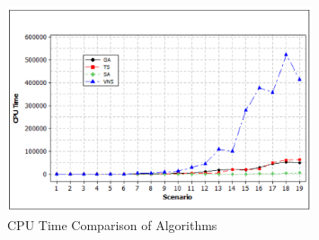 \begin{figure}[!ht]
    \centering
    \includegraphics[width=0.8\textwidth]{images/cpu_time_comparasion_of_algorithms.png}
    \caption{CPU Time Comparison of Algorithms \cite[pág 47]{WithTechniques}}
    \label{fig_comparison}
\end{figure}

